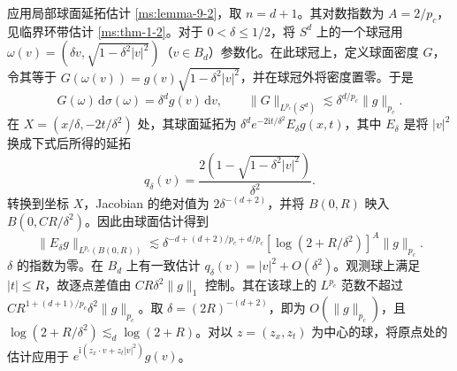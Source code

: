 应用局部球面延拓估计 \ref{ms:lemma-9-2}，取 $n=d+1$。其对数指数为 $A=2/p_c$，见临界环带估计 \ref{ms:thm-1-2}。对于 $0<\delta\leq 1/2$，将 $S^d$ 上的一个球冠用 $\omega(v)=(\delta v,\sqrt{1-\delta^2|v|^2})$（$v\in B_d$）参数化。在此球冠上，定义球面密度 $G$，令其等于 $G(\omega(v))=g(v)\sqrt{1-\delta^2|v|^2}$，并在球冠外将密度置零。于是
\[
G(\omega)\,\mathrm d\sigma(\omega)=\delta^d g(v)\,\mathrm dv,
\qquad
\|G\|_{L^{p_c}(S^d)}\lesssim \delta^{d/p_c}\|g\|_{p_c}.
\]
在 $X=(x/\delta,-2t/\delta^2)$ 处，其球面延拓为 $\delta^d e^{-2\mathrm it/\delta^2} E_\delta g(x,t)$，其中 $E_\delta$ 是将 $|v|^2$ 换成下式后所得的延拓
\[
q_\delta(v)=\frac{2(1-\sqrt{1-\delta^2|v|^2})}{\delta^2}.
\]
转换到坐标 $X$，Jacobian 的绝对值为 $2\delta^{-(d+2)}$，并将 $B(0,R)$ 映入 $B(0,CR/\delta^2)$。因此由球面估计得到
\[
\|E_\delta g\|_{L^{p_c}(B(0,R))}
 \lesssim \delta^{-d+(d+2)/p_c+d/p_c}
 [\log(2+R/\delta^2)]^A\|g\|_{p_c}.
\]
$\delta$ 的指数为零。在 $B_d$ 上有一致估计 $q_\delta(v)=|v|^2+O(\delta^2)$。观测球上满足 $|t|\leq R$，故逐点差值由 $CR\delta^2\|g\|_1$ 控制。其在该球上的 $L^{p_c}$ 范数不超过 $C R^{1+(d+1)/p_c}\delta^2\|g\|_{p_c}$。取 $\delta=(2R)^{-(d+2)}$，即为 $O(\|g\|_{p_c})$，且 $\log(2+R/\delta^2)\lesssim_d \log(2+R)$。对以 $z=(z_x,z_t)$ 为中心的球，将原点处的估计应用于 $e^{\mathrm i(z_x\cdot v+z_t|v|^2)}g(v)$。
